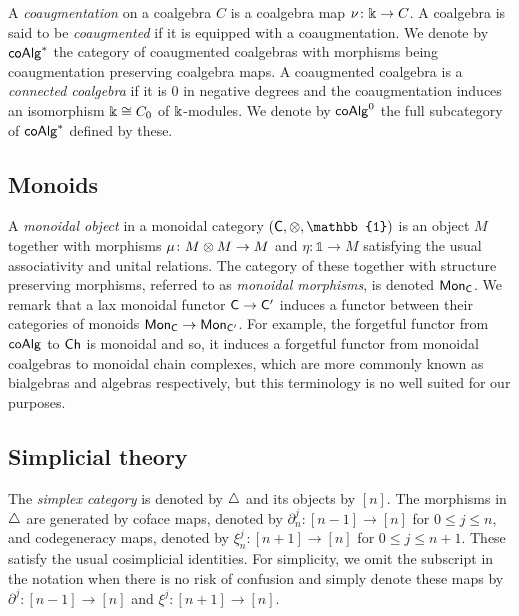 A \textit{coaugmentation} on a coalgebra $C$ is a coalgebra map $\nu \colon \Bbbk \to C$.
A coalgebra is said to be \textit{coaugmented} if it is equipped with a coaugmentation.
We denote by $\mathsf{coAlg}^\ast$ the category of coaugmented coalgebras with morphisms being coaugmentation preserving coalgebra maps.
A coaugmented coalgebra is a \textit{connected coalgebra} if it is $0$ in negative degrees and the coaugmentation induces an isomorphism $\Bbbk \cong C_0$ of $\Bbbk$-modules.
We denote by $\mathsf{coAlg}^0$ the full subcategory of $\mathsf{coAlg}^\ast$ defined by these.

\subsection{Monoids}

A \textit{monoidal object} in a monoidal category $(\sC, \ot, \mathbb{1})$ is an object $M$ together with morphisms $\mu \colon M \otimes M \to M$ and $\eta \colon \mathbb{1} \to M$ satisfying the usual associativity and unital relations.
The category of these together with structure preserving morphisms, referred to as \textit{monoidal morphisms}, is denoted $\mathsf{Mon}_{\mathsf{C}}$.
We remark that a lax monoidal functor $\mathsf{C} \to \mathsf{C}^\prime$ induces a functor between their categories of monoids $\mathsf{Mon}_{\mathsf{C}} \to \mathsf{Mon}_{\mathsf{C}^\prime}$.
For example, the forgetful functor from $\mathsf{coAlg}$ to $\mathsf{Ch}$ is monoidal and so, it induces a forgetful functor from monoidal coalgebras to monoidal chain complexes, which are more commonly known as bialgebras and algebras respectively, but this terminology is no well suited for our purposes.

\subsection{Simplicial theory}\label{ss:simplicial}

The \textit{simplex category} is denoted by $\triangle$ and its objects by $[n]$. The morphisms in $\triangle$ are generated by coface maps, denoted by $\partial^{j}_n \colon [n-1] \to [n]$ for $0\leq j \leq n$, and codegeneracy maps, denoted by $\xi^{j}_n \colon [n+1] \to [n]$ for $0 \leq j \leq n+1$. These satisfy the usual cosimplicial identities. For simplicity, we omit the subscript in the notation when there is no risk of confusion and simply denote these maps by $\partial^{j} \colon [n-1] \to [n]$ and $\xi^{j} \colon [n+1] \to [n]$.


